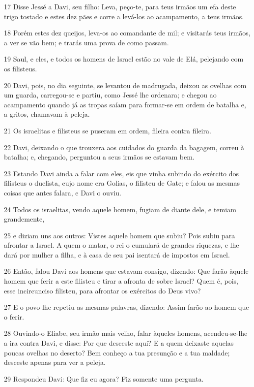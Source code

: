\par 17 Disse Jessé a Davi, seu filho: Leva, peço-te, para teus irmãos um efa deste trigo tostado e estes dez pães e corre a levá-los ao acampamento, a teus irmãos.
\par 18 Porém estes dez queijos, leva-os ao comandante de mil; e visitarás teus irmãos, a ver se vão bem; e trarás uma prova de como passam.
\par 19 Saul, e eles, e todos os homens de Israel estão no vale de Elá, pelejando com os filisteus.
\par 20 Davi, pois, no dia seguinte, se levantou de madrugada, deixou as ovelhas com um guarda, carregou-se e partiu, como Jessé lhe ordenara; e chegou ao acampamento quando já as tropas saíam para formar-se em ordem de batalha e, a gritos, chamavam à peleja.
\par 21 Os israelitas e filisteus se puseram em ordem, fileira contra fileira.
\par 22 Davi, deixando o que trouxera aos cuidados do guarda da bagagem, correu à batalha; e, chegando, perguntou a seus irmãos se estavam bem.
\par 23 Estando Davi ainda a falar com eles, eis que vinha subindo do exército dos filisteus o duelista, cujo nome era Golias, o filisteu de Gate; e falou as mesmas coisas que antes falara, e Davi o ouviu.
\par 24 Todos os israelitas, vendo aquele homem, fugiam de diante dele, e temiam grandemente,
\par 25 e diziam uns aos outros: Vistes aquele homem que subiu? Pois subiu para afrontar a Israel. A quem o matar, o rei o cumulará de grandes riquezas, e lhe dará por mulher a filha, e à casa de seu pai isentará de impostos em Israel.
\par 26 Então, falou Davi aos homens que estavam consigo, dizendo: Que farão àquele homem que ferir a este filisteu e tirar a afronta de sobre Israel? Quem é, pois, esse incircunciso filisteu, para afrontar os exércitos do Deus vivo?
\par 27 E o povo lhe repetiu as mesmas palavras, dizendo: Assim farão ao homem que o ferir.
\par 28 Ouvindo-o Eliabe, seu irmão mais velho, falar àqueles homens, acendeu-se-lhe a ira contra Davi, e disse: Por que desceste aqui? E a quem deixaste aquelas poucas ovelhas no deserto? Bem conheço a tua presunção e a tua maldade; desceste apenas para ver a peleja.
\par 29 Respondeu Davi: Que fiz eu agora? Fiz somente uma pergunta.
